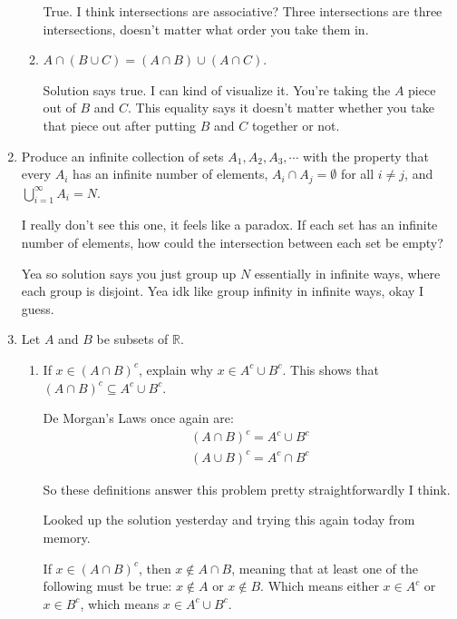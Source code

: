 \documentclass{article}
\numberwithin{equation}{subsection}
\numberwithin{theo}{subsection}
\begin{document}
\begin{enumerate}
\begin{enumerate}
        True. I think intersections are associative? Three intersections are
        three intersections, doesn't matter what order you take them in. 

        \item $A \cap (B \cup C) = (A \cap B) \cup (A \cap C)$.

        Solution says true. I can kind of visualize it. You're taking the $A$
        piece out of $B$ and $C$. This equality says it doesn't matter whether
        you take that piece out after putting $B$ and $C$ together or not.

    \end{enumerate}

    \item Produce an infinite collection of sets $A_1, A_2, A_3, \cdots$ with
        the property that every $A_i$ has an infinite number of elements, $A_i
        \cap A_j = \emptyset$ for all $i \neq j$, and $\bigcup_{i=1}^\infty A_i
        = N$.

        I really don't see this one, it feels like a paradox. If each set has an
        infinite number of elements, how could the intersection between each set
        be empty?

        Yea so solution says you just group up $N$ essentially in infinite ways,
        where each group is disjoint. Yea idk like group infinity in infinite
        ways, okay I guess.

    \item Let $A$ and $B$ be subsets of $\mathbb{R}$.

        \begin{enumerate}

            \item If $x \in (A \cap B)^c$, explain why $x \in A^c \cup B^c$.
                This shows that $(A \cap B)^c \subseteq A^c \cup B^c$.

            De Morgan's Laws once again are: 
            \begin{align*}
                (A \cap B)^c = A^c \cup B^c\\
                (A \cup B)^c = A^c \cap B^c
            \end{align*}

            So these definitions answer this problem pretty straightforwardly I
            think.

            Looked up the solution yesterday and trying this again today from memory.

            If $x \in (A \cap B)^c$, then $x \notin A \cap B$, meaning that at
            least one of the following must be true: $x \notin A$ or $x \notin
            B$. Which means either $x \in A^c$ or $x \in B^c$, which means $x
            \in A^c \cup B^c$.  


\end{enumerate}
\end{enumerate}
\end{document}
